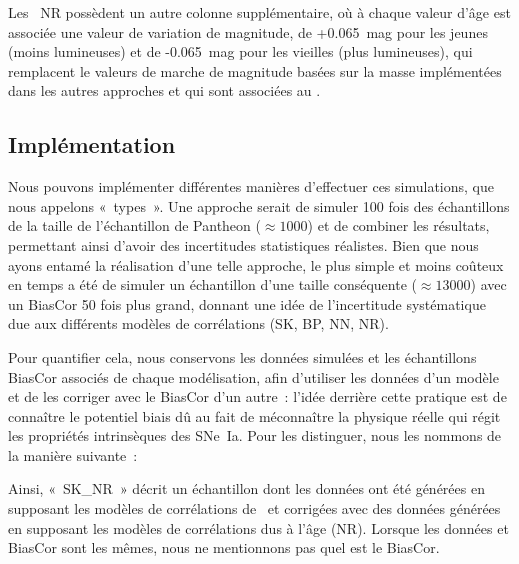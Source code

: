 \documentclass[../main/main.tex]{subfiles}
\begin{document}
Les \hostlib\ NR possèdent un autre colonne supplémentaire, où à chaque valeur
d'âge est associée une valeur de variation de magnitude, de +\SI{0,065}{mag}
pour les jeunes (moins lumineuses) et de -\SI{0,065}{mag} pour les vieilles
(plus lumineuses), qui remplacent le valeurs de marche de magnitude basées sur
la masse implémentées dans les autres approches et qui sont associées au
\wgtmap.

\subsection{Implémentation}\label{ssec:snaimpl} 

Nous pouvons implémenter différentes manières d'effectuer ces simulations, que
nous appelons «~types~». Une approche serait de simuler 100 fois des
échantillons de la taille de l'échantillon de Pantheon ($\approx \num{1000}$) et
de combiner les résultats, permettant ainsi d'avoir des incertitudes
statistiques réalistes. Bien que nous ayons entamé la réalisation d'une telle
approche, le plus simple et moins coûteux en temps a été de simuler un
échantillon d'une taille conséquente ($\approx \num{13 000}$) avec un BiasCor 50
fois plus grand, donnant une idée de l'incertitude systématique due aux
différents modèles de corrélations (SK, BP, NN, NR).

Pour quantifier cela, nous conservons les données simulées et les échantillons
BiasCor associés de chaque modélisation, afin d'utiliser les données d'un modèle
et de les corriger avec le BiasCor d'un autre~: l'idée derrière cette pratique
est de connaître le potentiel biais dû au fait de méconnaître la physique réelle
qui régit les propriétés intrinsèques des SNe~Ia. Pour les distinguer, nous les
nommons de la manière suivante~:
\begin{center}
\end{center}
Ainsi, «~SK\_NR~» décrit un échantillon dont les données ont été générées en
supposant les modèles de corrélations de~ et corrigées
avec des données générées en supposant les modèles de corrélations dus à l'âge
(NR). Lorsque les données et BiasCor sont les mêmes, nous ne mentionnons pas
quel est le BiasCor. 
\end{document}
